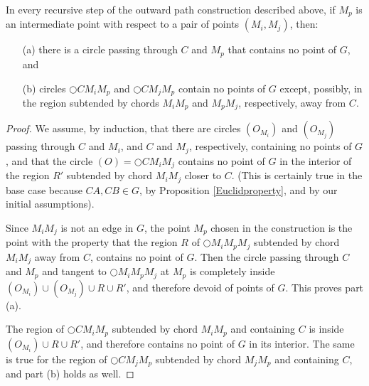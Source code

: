 \documentclass{stacs_proc}
\theoremstyle{plain}\newtheorem{satz}[thm]{Satz}
\begin{document}
\begin{proposition}
\label{nocross} In every recursive step of the outward path
construction described above, if $M_p$ is an intermediate point with
respect to a pair of points $(M_i,M_j)$, then:
\begin{itemize}

\item[(a)] there is a circle passing through $C$ and $M_p$ that contains
no point of $G$, and

\item[(b)] circles $\bigcirc{CM_iM_p}$ and $\bigcirc{CM_jM_p}$ contain no
points of $G$ except, possibly, in the region subtended by chords $M_iM_p$
and $M_pM_j$, respectively, away from $C$.
\end{itemize}
\begin{proof}
We assume, by induction, that there are circles $(O_{M_i})$ and
$(O_{M_j})$ passing through $C$ and $M_i$, and $C$ and $M_j$,
respectively, containing no points of $G$, and that the circle
$(O)=\bigcirc{CM_iM_j}$ contains no point of $G$ in the interior of
the region $R'$ subtended by chord $M_iM_j$ closer to $C$.
(This is certainly true in the base case because $CA, CB \in G$, by
Proposition \ref{Euclidproperty}, and by our initial assumptions).

Since $M_iM_j$ is not an edge in $G$, the point $M_p$ chosen in the
construction is the point with the property that the region $R$ of
$\bigcirc{M_iM_pM_j}$ subtended by chord $M_iM_j$ away from $C$, contains
no point of $G$. Then the circle passing
through $C$ and $M_p$ and tangent to $\bigcirc{M_iM_pM_j}$ at $M_p$
is completely inside $(O_{M_i}) \cup (O_{M_j}) \cup R \cup R'$, and
therefore devoid of points of $G$. This proves part (a).

The region of $\bigcirc{CM_iM_p}$ subtended by chord
$M_iM_p$ and containing $C$ is inside $(O_{M_i}) \cup R \cup R'$,
and therefore contains no point of $G$ in its interior. The same is
true for the region of $\bigcirc{CM_jM_p}$ subtended by chord
$M_jM_p$ and containing $C$, and part (b) holds as well.
\end{proof}
\end{proposition}
\end{document}
